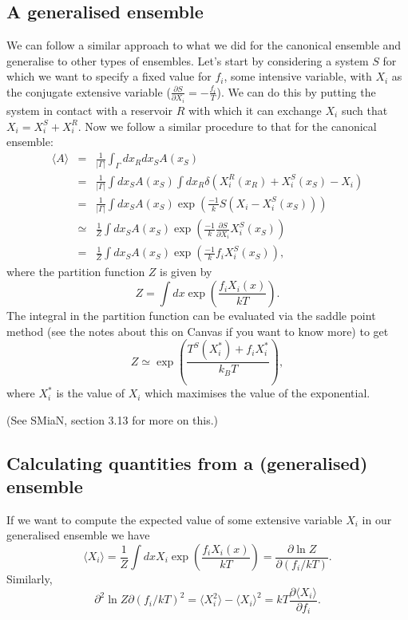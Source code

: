 \subsection{A generalised ensemble}
We can follow a similar approach to what we did for the canonical ensemble and generalise to other types of ensembles. Let's start by considering a system $S$ for which we want to specify a fixed value for $f_i$, some intensive variable, with $X_i$ as the conjugate extensive variable ($\frac{\partial S}{\partial X_i}=-\frac{f_i}{T}$). We can do this by putting the system in contact with a reservoir $R$ with which it can exchange $X_i$ such that $X_i = X_i^S+X_i^R$. Now we follow a similar procedure to that for the canonical ensemble:
\begin{eqnarray*}
	\langle A \rangle &=& \frac{1}{|\Gamma|}\int_{\Gamma}dx_R dx_S A(x_S)\\
	&=& \frac{1}{|\Gamma|}\int dx_S A(x_S)\int dx_R \delta(X_i^R(x_R)+X_i^S(x_S)-X_i)\\
	&=& \frac{1}{|\Gamma|}\int dx_S A(x_S)\exp\left( \frac{-1}{k}S(X_i-X_i^S(x_S))\right)\\
	&\simeq& \frac{1}{Z}\int dx_S A(x_S)\exp\left( \frac{-1}{k}\frac{\partial S}{\partial X_i}X_i^S(x_S)\right)\\
	&=& \frac{1}{Z}\int dx_S A(x_S)\exp\left( \frac{-1}{k} f_i X_i^S(x_S)\right),
\end{eqnarray*}
where the partition function $Z$ is given by
$$
	Z= \int dx \exp\left( \frac{f_iX_i(x)}{kT} \right).
$$
The integral in the partition function can be evaluated via the saddle point method (see the notes about this on Canvas if you want to know more) to get
\begin{equation*}
	Z \simeq \exp\left(\frac{T^S(X_i^*)+f_iX_i^*}{k_BT}\right),
\end{equation*}
where $X_i^*$ is the value of $X_i$ which maximises the value of the exponential.

(See SMiaN, section 3.13 for more on this.)

\subsection{Calculating quantities from a (generalised) ensemble}

If we want to compute the expected value of some extensive variable $X_i$ in our generalised ensemble we have
\[
	\langle X_i\rangle = \frac{1}{Z}\int dx X_i \exp\left(\frac{f_iX_i(x)}{kT}\right) = \frac{\partial \ln Z}{\partial (f_i/kT)}.
\]
Similarly,
\[
	{\partial^2 \ln Z}{\partial (f_i/kT)^2} = \langle X_i^2 \rangle - \langle X_i \rangle^2 = kT\frac{\partial \langle X_i\rangle}{\partial f_i}.
\]

